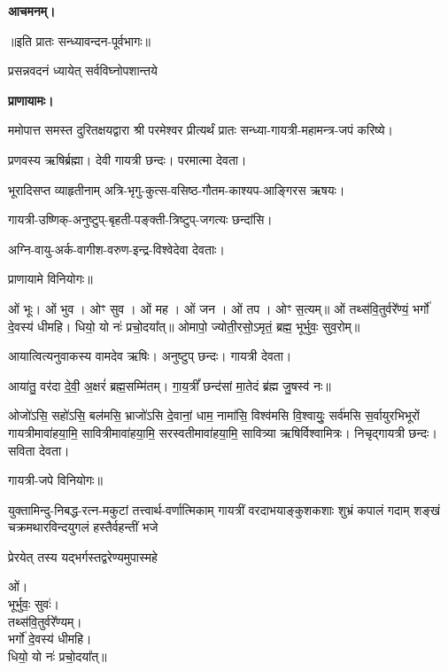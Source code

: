 \textbf{आचमनम्।}


\centerline{॥इति प्रातः सन्ध्यावन्दन-पूर्वभागः॥}



{प्रसन्नवदनं ध्यायेत् सर्वविघ्नोपशान्तये}

\textbf{प्राणायामः।}

ममोपात्त समस्त दुरितक्षयद्वारा श्री परमेश्वर प्रीत्यर्थं प्रातः सन्ध्या-गायत्री-महामन्त्र-जपं करिष्ये।


प्रणवस्य ऋषिर्ब्रह्मा।
देवी गायत्री छन्दः।
परमात्मा देवता।

भूरादिसप्त व्याहृतीनाम् अत्रि-भृगु-कुत्स-वसिष्ठ-गौतम-काश्यप-आङ्गिरस ऋषयः।

गायत्री-उष्णिक्-अनुष्टुप्-बृहती-पङ्क्ती-त्रिष्टुप्-जगत्यः छन्दांसि।

अग्नि-वायु-अर्क-वागीश-वरुण-इन्द्र-विश्वेदेवा देवताः।
      
प्राणायामे विनियोगः॥


ओं भूः। ओं भुव। ओꣳ सुव। ओं मह। ओं जन। ओं तप। ओꣳ स॒त्यम्॥
ओं तथ्स॑वि॒तुर्वरे᳚ण्यं॒ भर्गो॑ दे॒वस्य॑ धीमहि। धियो॒ यो नः॑ प्रचो॒दया᳚त्॥
ओमापो॒ ज्योती॒रसो॒ऽमृतं॒ ब्रह्म॒ भूर्भुवः॒ सुव॒रोम्॥




आयात्वित्यनुवाकस्य वामदेव ऋषिः।
अनुष्टुप् छन्दः।
गायत्री देवता।

आया॑तु॒ वर॑दा दे॒वी॒ अ॒क्षरं॑ ब्रह्म॒सम्मि॑तम्। गा॒य॒त्रीं᳚ छन्द॑सां मा॒तेदं ब्र॑ह्म जु॒षस्व॑ नः॥

ओजो॑ऽसि॒ सहो॑ऽसि॒ बल॑मसि॒ भ्राजो॑ऽसि दे॒वानां॒ धाम॒ नामा॑सि॒ विश्व॑मसि वि॒श्वायुः॒ सर्व॑मसि स॒र्वायुरभिभूरों गायत्रीमावा॑हया॒मि॒ सावित्रीमावा॑हया॒मि॒ सरस्वतीमावा॑ह\-या॒मि॒ सावित्र्या ऋषिर्विश्वामित्रः। निचृद्गायत्री छन्दः। सविता देवता।

गायत्री-जपे विनियोगः॥



{युक्तामिन्दु-निबद्ध-रत्न-मकुटां तत्त्वार्थ-वर्णात्मिकाम्}
{गायत्रीं वरदाभयाङ्कुशकशाः शुभ्रं कपालं गदाम्}
{शङ्खं चक्रमथारविन्दयुगलं हस्तैर्वहन्तीं भजे}

{प्रेरयेत् तस्य यद्भर्गस्तद्वरेण्यमुपास्महे}


ओं।\\
भूर्भुवः॒ सुवः॑।\\
तथ्स॑वि॒तुर्वरे᳚ण्यम्।\\
भर्गो॑ दे॒वस्य॑ धीमहि।\\
धियो॒ यो नः॑ प्रचो॒दया᳚त्॥

